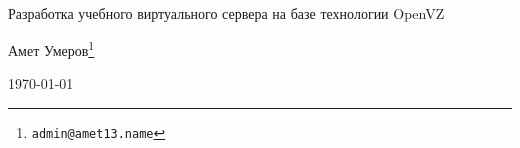 
{~}\bigskip %

\begin{center}
\Huge{Разработка учебного виртуального сервера на базе технологии OpenVZ} %

\vspace{1em}
\Large{Амет Умеров}\footnote{\texttt{admin@amet13.name}} %

\Large{\today} %
\end{center}

\clearpage %
